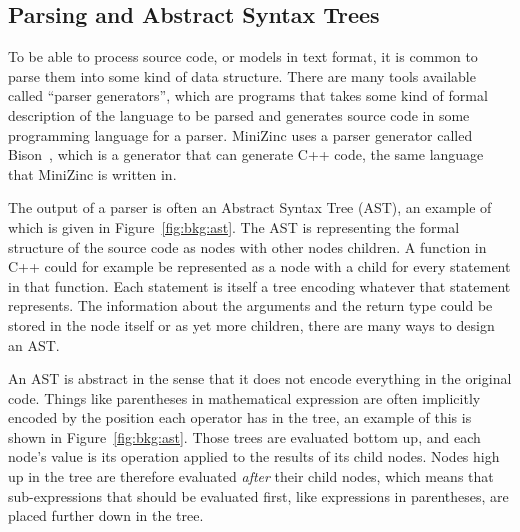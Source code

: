\documentclass[a4paper,12pt]{article}
\begin{document}
\subsection{Parsing and Abstract Syntax Trees}\label{sec:parsing}
To be able to process source code, or models in text format, it is common to parse them
into some kind of data structure. There are many tools available called ``parser
generators'', which are programs that takes some kind of formal description of the
language to be parsed and generates source code in some programming language for a parser.
MiniZinc uses a parser generator called Bison~\cite{flexbison}, which is a generator that
can generate C++ code, the same language that MiniZinc is written in.

The output of a parser is often an Abstract Syntax Tree (AST), an example of which is
given in Figure~\ref{fig:bkg:ast}. The AST is representing the formal structure of the
source code as nodes with other nodes children. A function in C++ could for example be
represented as a node with a child for every statement in that function. Each statement is
itself a tree encoding whatever that statement represents. The information
about the arguments and the return type could be stored in the node itself or as yet more
children, there are many ways to design an AST.



An AST is abstract in the sense that it does not encode everything in the original code.
Things like parentheses in mathematical expression are often implicitly encoded by the
position each operator has in the tree, an example of this is shown in
Figure~\ref{fig:bkg:ast}. Those trees are evaluated bottom up, and each node's value is
its operation applied to the results of its child nodes. Nodes high up in the tree are
therefore evaluated \emph{after} their child nodes, which means that sub-expressions that
should be evaluated first, like expressions in parentheses, are placed further down in the
tree.
\end{document}
